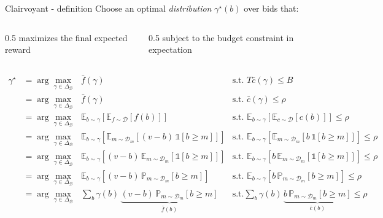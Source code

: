 \begin{frame}{Clairvoyant - definition}
    Choose an optimal \emph{distribution} $\gamma^\star(b)$ over bids that:
    \begin{columns}[T]
        \begin{column}{0.5\textwidth}
            \centering
            maximizes the final expected reward
        \end{column}
        \begin{column}{0.5\textwidth}
            \centering
            subject to the budget constraint in expectation
        \end{column}
    \end{columns}

    \vspace{-0.2cm}
    
    \small\begin{equation*}
        \begin{aligned}
            \gamma^\star &= \arg \max_{\gamma \in \Delta_\mathcal{B}} ~~~ \bar{f}(\gamma) \qquad \qquad \qquad \qquad \qquad \qquad \qquad & \text{s.t.  } T \bar{c}(\gamma) \le B \\
            &= \arg \max_{\gamma \in \Delta_\mathcal{B}} ~~~ \bar{f}(\gamma) & \text{s.t.  } \bar{c}(\gamma) \le \rho \\    
            &= \arg \max_{\gamma \in \Delta_\mathcal{B}} ~~~ \mathbb{E}_{b \sim \gamma}\left[ \mathbb{E}_{f \sim \mathcal{D}}\left[ f(b) \right] \right] & \text{s.t.  } \mathbb{E}_{b \sim \gamma}\left[ \mathbb{E}_{c \sim \mathcal{D}}\left[ c(b) \right] \right] \le \rho \\
            &= \arg \max_{\gamma \in \Delta_\mathcal{B}} ~~~ \mathbb{E}_{b \sim \gamma}\left[ \mathbb{E}_{m \sim \mathcal{D}_m}\left[(v - b)\, \mathds{1}\left[b \ge m \right] \right] \right] & \text{s.t.  } \mathbb{E}_{b \sim \gamma}\left[ \mathbb{E}_{m \sim \mathcal{D}_m}\left[ b\, \mathds{1}\left[b \ge m \right] \right] \right] \le \rho \\    
            &= \arg \max_{\gamma \in \Delta_\mathcal{B}} ~~~ \mathbb{E}_{b \sim \gamma}\left[(v - b)\, \mathbb{E}_{m \sim \mathcal{D}_m}\left[\mathds{1}\left[ b \ge m \right] \right] \right] & \text{s.t.  } \mathbb{E}_{b \sim \gamma}\left[b\, \mathbb{E}_{m \sim \mathcal{D}_m}\left[ \mathds{1}\left[b \ge m \right] \right] \right] \le \rho \\    
            &= \arg \max_{\gamma \in \Delta_\mathcal{B}} ~~~ \mathbb{E}_{b \sim \gamma}\left[(v - b)\, \mathbb{P}_{m \sim \mathcal{D}_m}\left[b \ge m \right] \right] & \text{s.t.  } \mathbb{E}_{b \sim \gamma}\left[b\, \mathbb{P}_{m \sim \mathcal{D}_m}\left[b \ge m \right] \right] \le \rho \\    
            &= \arg \max_{\gamma \in \Delta_\mathcal{B}} ~~~ \sum_b \gamma(b)\, \underbrace{(v - b)\, \mathbb{P}_{m \sim \mathcal{D}_m} \left[b \ge m \right]}_{\bar{f}(b)} & \text{s.t.} \sum_b \gamma(b)\, \underbrace{b\, \mathbb{P}_{m \sim \mathcal{D}_m}\left[b \ge m \right]}_{\bar{c}(b)} \le \rho
        \end{aligned}
    \end{equation*}
\end{frame}

